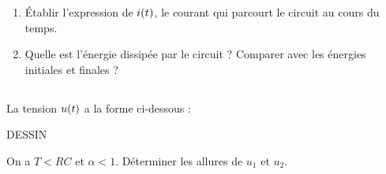 \documentclass[a4paper,french,bookmarks]{book}
\begin{document}
    \begin{enumerate}
        \item Établir l'expression de $i\!\left(t\right)$, le courant qui parcourt le circuit au cours du temps.
        
        \boxans{
        
        }
        
        \item Quelle est l'énergie dissipée par le circuit ? Comparer avec les énergies initiales et finales ?
        
        \boxans{
        
        }
    \end{enumerate}
    
    \subsection{}
    
    \subsection{}
    
    La tension $u\!\left(t\right)$ a la forme ci-dessous :
    
    DESSIN 
    
    On a $T < RC$ et $\alpha < 1$. Déterminer les allures de $u_1$ et $u_2$.
    
    \boxans{
    
    }
    \subsection{}

    \subsection{}
\end{document}
